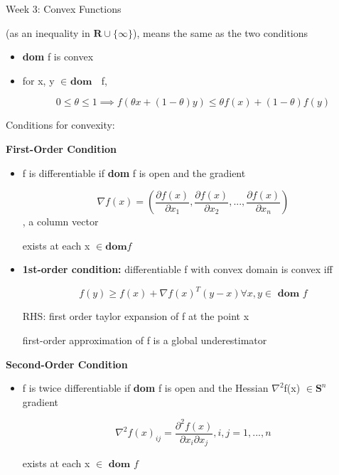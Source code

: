 \documentclass{article}
\begin{document}
\begin{homeworkProblemName}{{\LARGE Week 3: Convex Functions}}
\begin{problemAnswer}
{\begin{itemize}
          (as an inequality in $\bm{R} \cup \{\infty\}$), means the same as the two conditions
            \begin{itemize}
            \item \textbf{dom } f is convex
            \item for x, y $\in \textbf{ dom }$ f,

              $$ 0 \leq \theta \leq 1 \implies f(\theta x + (1 - \theta)y) \leq \theta f(x) + (1 - \theta)f(y) $$
            \end{itemize}
        \end{itemize}
      }\end{problemAnswer}

    \newpage

    \begin{problemAnswer}{

      Conditions for convexity:

      \textbf{First-Order Condition}
      \begin{itemize}
      \item f is differentiable if \textbf{dom} f is open and the gradient

        $$ \nabla f(x) = ( \frac{\partial f(x)}{\partial x_1}, \frac{\partial f(x)}{\partial x_2}, ..., \frac{\partial
          f(x)}{\partial x_n}) $$, a column vector

        exists at each x $\in \textbf{dom} f$

      \item \textbf{1st-order condition: } differentiable f with convex domain
        is convex iff

        $$ f(y) \geq f(x) + \nabla f(x)^T(y-x) \forall x, y \in \textbf{ dom } f $$

        RHS: first order taylor expansion of f at the point x

        first-order approximation of f is a global underestimator
      \end{itemize}

      \textbf{Second-Order Condition}
      \begin{itemize}
      \item f is twice differentiable if \textbf{dom} f is open and the Hessian
        $\nabla^2$f(x) $\in \textbf{S}^n$ gradient

        $$ \nabla^2 f(x)_{ij} = \frac{\partial^2 f(x)}{\partial x_i \partial x_j}, i, j = 1,...,n$$

        exists at each x $\in \textbf{ dom }f$


\end{itemize}}
\end{problemAnswer}
\end{homeworkProblemName}
\end{document}
